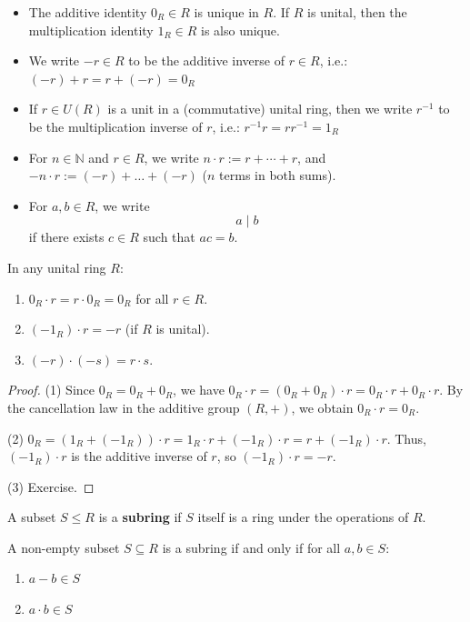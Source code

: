 \begin{remark}
\begin{itemize}
    \item The additive identity $0_R \in R$ is unique in $R$. If $R$ is unital, then the multiplication identity $1_R\in R$ is also unique.
    \item We write $-r\in R $ to be the additive inverse of $r\in R$, i.e.: $(-r)+r=r+(-r)=0_R$
    \item If $r\in U(R)$ is a unit in a (commutative) unital ring, then we write $r^{-1}$ to be the multiplication inverse of $r$, i.e.: $r^{-1}r=rr^{-1}=1_R$
    \item For $n\in \mathbb{N}$ and $r\in R$, we write $n\cdot r:=r+\cdots + r$, and $-n\cdot r := (-r) + \dots + (-r)$ ($n$ terms in both sums).
    \item For $a,b\in R$, we write 
$$a\mid b$$ if there exists $c\in R$ such that $ac=b$.
\end{itemize}
\end{remark}

\begin{proposition}
In any unital ring $R$:
\begin{enumerate}
    \item $0_R \cdot r = r \cdot 0_R = 0_R$ for all $r \in R$.
    \item $(-1_R) \cdot r = -r$ (if $R$ is unital).
    \item $(-r) \cdot (-s) = r \cdot s$.
\end{enumerate}
\end{proposition}

\begin{proof}
(1) Since $0_R = 0_R + 0_R$, we have $0_R \cdot r = (0_R + 0_R) \cdot r = 0_R \cdot r + 0_R \cdot r$. By the cancellation law in the additive group $(R, +)$, we obtain $0_R \cdot r = 0_R$.

(2) $0_R = (1_R + (-1_R)) \cdot r = 1_R \cdot r + (-1_R) \cdot r = r + (-1_R) \cdot r$. Thus, $(-1_R) \cdot r$ is the additive inverse of $r$, so $(-1_R) \cdot r = -r$. 

(3) Exercise.
\end{proof}

\begin{definition}[Subring]
A subset $S \leq R$ is a \textbf{subring} if $S$ itself is a ring under the operations of $R$.
\end{definition}

\begin{proposition}
A non-empty subset $S \subseteq R$ is a subring if and only if for all $a, b \in S$:
\begin{enumerate}
    \item $a - b \in S$
    \item $a \cdot b \in S$
\end{enumerate}
\end{proposition}


